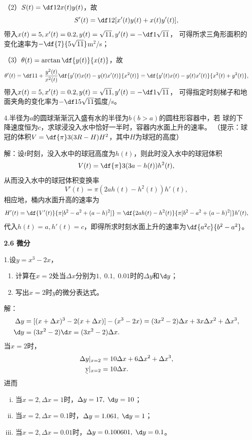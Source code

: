 （2）$S(t)=\df12x(t)y(t)$，故
$$S'(t)=\df12[x'(t)y(t)+x(t)y'(t)],$$
带入$x(t)=5,x'(t)=0.2,y(t)=\sqrt{11},y'(t)=-\df1{\sqrt{11}}$，
可得所求三角形面积的变化速率为$-\df{7}{5\sqrt{11}}$m$^2$/s；

（3）$\theta(t)=\arctan\df{y(t)}{x(t)}$，故
$$\theta'(t)=\df1{1+\frac{y^2(t)}{x^2(t)}}
\df{y'(t)x(t)-y(t)x'(t)}{x^2(t)}=\df{y'(t)x(t)-y(t)x'(t)}{x^2(t)+y^2(t)},$$
带入$x(t)=5,x'(t)=0.2,y(t)=\sqrt{11},y'(t)=-\df1{\sqrt{11}}$，
可得指定时刻梯子和地面夹角的变化率为$-\df1{5\sqrt{11}}$弧度/s。\fin

\bigskip

4.半径为$a$的圆球渐渐沉入盛有水的半径为$b(b>a)$的圆柱形容器中，若
球的下降速度恒为$c$，求球浸没入水中恰好一半时，容器内水面上升的速率。
（提示：球冠的体积$V=\df{\pi}3(3R-H)H^2$，其中$H$为球冠的高度）

解：设$t$时刻，没入水中的球冠高度为$h(t)$，则此时没入水中的球冠体积
$$V(t)=\df{\pi}3(3a-h(t))h^2(t),$$
从而没入水中的球冠体积变换率
$$V'(t)=\pi(2ah(t)-h^2(t))h'(t),$$
相应地，桶内水面升高的速率为
$$H'(t)=\df{V'(t)}{\pi [b^2-a^2+(a-h)^2]}
=\df{2ah(t)-h^2(t)}{\pi [b^2-a^2+(a-h)^2]}h'(t),$$
代入$h(t)=a,h'(t)=c$，即得所求时刻水面上升的速率为$\df{a^2c}{b^2-a^2}$。
\fin

\begin{center}
	\bf 2.6 微分
\end{center}

\bigskip

1.设$y=x^3-2x$，
\begin{enumerate}[(1)]
  \setlength{\itemindent}{1cm}
  \item 计算在$x=2$处当$\Delta x$分别为$1,\;0.1,\;
  0.01$时的$\Delta y$和$\d y$；
  \item 写出$x=2$时$y$的微分表达式。
\end{enumerate}

解：
\begin{align*}
	\Delta y&=[(x+\Delta x)^3-2(x+\Delta x)]-(x^3-2x)
	=(3x^2-2)\Delta x+3x\Delta x^2+\Delta x^3,\\
	\d y&=(3x^2-2)\d x=(3x^2-2)\Delta x.
\end{align*}
当$x=2$时，
\begin{align*}
	\Delta y|_{x=2}&
	=10\Delta x+6\Delta x^2+\Delta x^3,\\
	\d y|_{x=2}&=10\Delta x.
\end{align*}
进而
\begin{enumerate}[(i)]
  \item 当$x=2,\Delta x=1$时，$\Delta y=17,\;\d y=10$；
  \item 当$x=2,\Delta x=0.1$时，$\Delta y=1.061,\;\d y=1$；
  \item 当$x=2,\Delta x=0.01$时，$\Delta y=0.100601,\;\d y=0.1$。
\end{enumerate}
\fin

